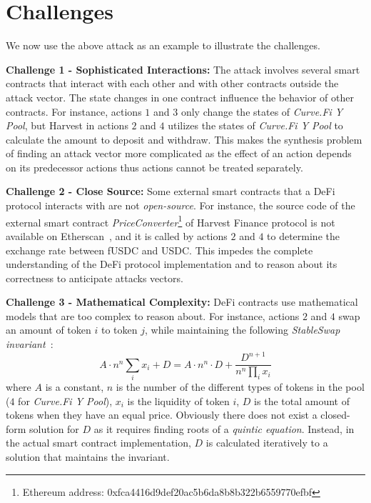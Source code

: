 \section{Challenges}

We now use the above attack as an example to illustrate the challenges. 

\noindent \textbf{Challenge 1 - Sophisticated Interactions:} The attack
involves several smart contracts that interact with each other and with
other contracts outside the attack vector. The state changes in one contract
influence the behavior of other contracts. For instance, actions $1$ and $3$
only change the states of \emph{Curve.Fi Y Pool}, but Harvest in actions $2$
and $4$ utilizes the states of \emph{Curve.Fi Y Pool} to calculate the amount to
deposit and withdraw.
This makes the synthesis problem of finding an attack vector more complicated
as the effect of an action depends on its predecessor actions thus actions
cannot be treated separately.

\noindent \textbf{Challenge 2 - Close Source:} Some external smart contracts
that a DeFi protocol interacts with are not \emph{open-source}. For instance,
the source code of the external smart contract
\emph{PriceConverter}\footnote{Ethereum address:
0xfca4416d9def20ac5b6da8b8b322b6559770efbf} of Harvest Finance protocol is not
available on Etherscan~\cite{etherscan}, and it is called by actions $2$ and
$4$ to determine the exchange rate between fUSDC and USDC.
This impedes the complete understanding of the DeFi protocol implementation and
to reason about its correctness to anticipate attacks vectors.

\noindent \textbf{Challenge 3 - Mathematical Complexity:} DeFi contracts use
mathematical models that are too complex to reason about. For instance, actions
$2$ and $4$ swap an amount of token $i$ to token $j$, while maintaining the
following \emph{StableSwap invariant}~\cite{egorov2019stableswap}: 
$$A\cdot n^n\sum_i x_i  + D = A \cdot n^n \cdot D + \frac{D^{n+1}}{n^n \prod_{i}{x_i}}$$
where $A$ is a constant, $n$ is the number of the different types of tokens in
the pool ($4$ for \emph{Curve.Fi Y Pool}), $x_i$ is the liquidity of token $i$,
$D$ is the total amount of tokens when they have an equal price. Obviously
there does not exist a closed-form solution for $D$ as it requires finding
roots of a \emph{quintic equation}. Instead, in the actual smart contract
implementation, $D$ is calculated iteratively to a solution that maintains the
invariant.

